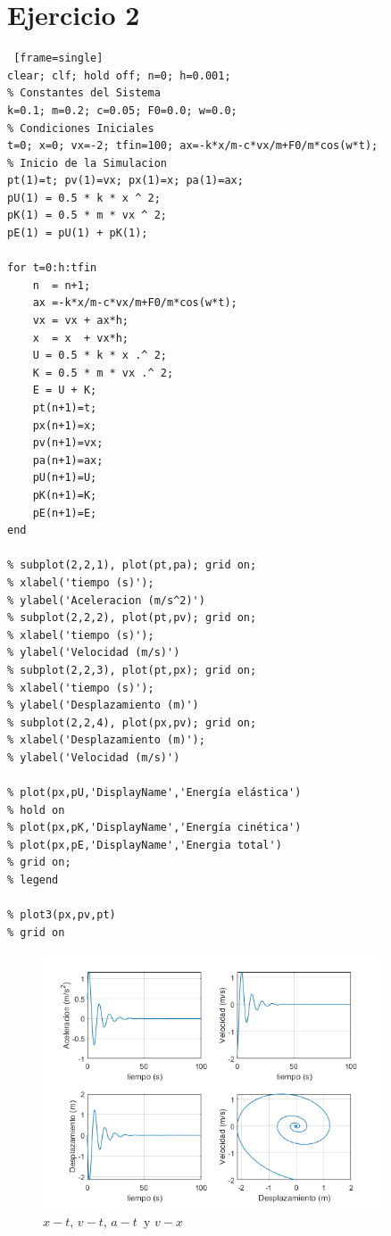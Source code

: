 \documentclass{article}
\begin{document}
\section{Ejercicio 2}

\begin{lstlisting} [frame=single]
clear; clf; hold off; n=0; h=0.001;
% Constantes del Sistema
k=0.1; m=0.2; c=0.05; F0=0.0; w=0.0;
% Condiciones Iniciales
t=0; x=0; vx=-2; tfin=100; ax=-k*x/m-c*vx/m+F0/m*cos(w*t);
% Inicio de la Simulacion
pt(1)=t; pv(1)=vx; px(1)=x; pa(1)=ax;
pU(1) = 0.5 * k * x ^ 2;
pK(1) = 0.5 * m * vx ^ 2;
pE(1) = pU(1) + pK(1);

for t=0:h:tfin
    n  = n+1;
    ax =-k*x/m-c*vx/m+F0/m*cos(w*t);
    vx = vx + ax*h;
    x  = x  + vx*h;
    U = 0.5 * k * x .^ 2;
    K = 0.5 * m * vx .^ 2;
    E = U + K;
    pt(n+1)=t;
    px(n+1)=x;
    pv(n+1)=vx;
    pa(n+1)=ax;
    pU(n+1)=U;
    pK(n+1)=K;
    pE(n+1)=E;
end

% subplot(2,2,1), plot(pt,pa); grid on;
% xlabel('tiempo (s)');
% ylabel('Aceleracion (m/s^2)')
% subplot(2,2,2), plot(pt,pv); grid on;
% xlabel('tiempo (s)');
% ylabel('Velocidad (m/s)')
% subplot(2,2,3), plot(pt,px); grid on;
% xlabel('tiempo (s)');
% ylabel('Desplazamiento (m)')
% subplot(2,2,4), plot(px,pv); grid on;
% xlabel('Desplazamiento (m)');
% ylabel('Velocidad (m/s)')

% plot(px,pU,'DisplayName','Energía elástica')
% hold on
% plot(px,pK,'DisplayName','Energía cinética')
% plot(px,pE,'DisplayName','Energia total')
% grid on;
% legend

% plot3(px,pv,pt)
% grid on
\end{lstlisting}

\begin{figure}[H]
\centering
    \includegraphics[width=0.9\textwidth]{images/002A.png}
    \caption{$x-t$, $v-t$, $a-t $~y $v-x$}
\end{figure}
\end{document}

